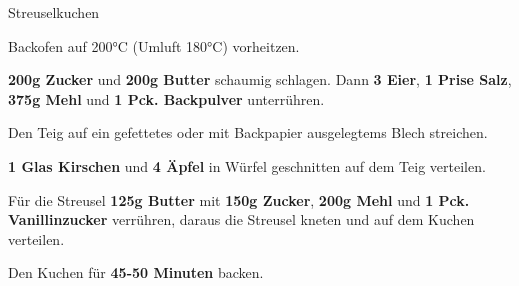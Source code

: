 \begin{recipe}[]{Streuselkuchen} %

\step
Backofen auf 200°C (Umluft 180°C) vorheitzen.

\step
\textbf{200g Zucker} und \textbf{200g Butter} schaumig schlagen. Dann \textbf{3 Eier}, \textbf{1 Prise Salz}, \textbf{375g Mehl} und \textbf{1 Pck. Backpulver} unterrühren.

\step
Den Teig auf ein gefettetes oder mit Backpapier ausgelegtems Blech streichen.

\step
\textbf{1 Glas Kirschen} und \textbf{4 Äpfel} in Würfel geschnitten auf dem Teig verteilen.

\step
Für die Streusel \textbf{125g Butter} mit \textbf{150g Zucker}, \textbf{200g Mehl} und \textbf{1 Pck. Vanillinzucker} verrühren, daraus die Streusel kneten und auf dem Kuchen verteilen.

\step
Den Kuchen für \textbf{45-50 Minuten} backen.

\end{recipe}